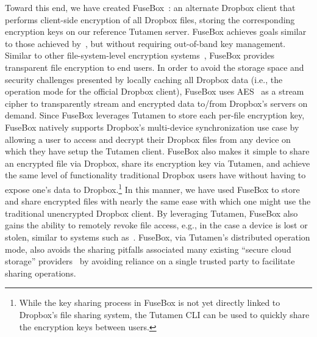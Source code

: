 Toward this end, we have created FuseBox~\cite{fusebox}: an alternate
Dropbox client that performs client-side encryption of all Dropbox
files, storing the corresponding encryption keys on our reference
Tutamen server. FuseBox achieves goals similar to those achieved
by~\cite{goh2003}, but without requiring out-of-band key
management. Similar to other file-system-level encryption
systems~\cite{blaze1993, Cattaneo2001, halcrow}, FuseBox provides
transparent file encryption to end users. In order to avoid the
storage space and security challenges presented by locally caching all
Dropbox data (i.e., the operation mode for the official Dropbox
client), FuseBox uses AES~\cite{daemen1999, nist2001} as a stream
cipher to transparently stream and encrypted data to/from Dropbox's
servers on demand. Since FuseBox leverages Tutamen to store each
per-file encryption key, FuseBox natively supports Dropbox's
multi-device synchronization use case by allowing a user to access and
decrypt their Dropbox files from any device on which they have setup
the Tutamen client. FuseBox also makes it simple to share an encrypted
file via Dropbox, share its encryption key via Tutamen, and achieve
the same level of functionality traditional Dropbox users have without
having to expose one's data to Dropbox.\footnote{While the key sharing
  process in FuseBox is not yet directly linked to Dropbox's file
  sharing system, the Tutamen CLI can be used to quickly share the
  encryption keys between users.} In this manner, we have used FuseBox
to store and share encrypted files with nearly the same ease with
which one might use the traditional unencrypted Dropbox client. By
leveraging Tutamen, FuseBox also gains the ability to remotely revoke
file access, e.g., in the case a device is lost or stolen, similar to
systems such as~\cite{geambasu2011}. FuseBox, via Tutamen's
distributed operation mode, also avoids the sharing pitfalls
associated many existing ``secure cloud storage''
providers~\cite{wilson2014} by avoiding reliance on a single trusted
party to facilitate sharing operations.

